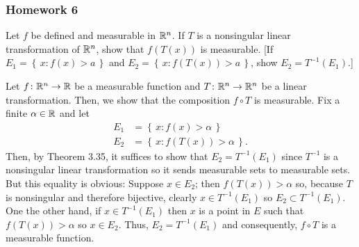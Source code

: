 \subsubsection{Homework 6}
\setcounter{exercise}{0}
\begin{problem}
  Let $f$ be defined and measurable in $\mathbb{R}^n$. If $T$ is a nonsingular
  linear transformation of $\mathbb{R}^n$, show that $f(T(x))$ is measurable. [If
  $E_1=\left\{\,x: f(x)>a\,\right\}$ and
  $E_2=\left\{\,x:f(T(x))>a\,\right\}$, show $E_2=T^{-1}(E_1)$.]
\end{problem}
\begin{solution}
  Let $f\colon\mathbb{R}^n\to\mathbb{R}$ be a measurable function and
  $T\colon\mathbb{R}^n\to\mathbb{R}^n$ be a linear transformation. Then, we show that
  the composition $f\circ T$ is measurable. Fix a finite $\alpha\in\mathbb{R}$
  and let
  \begin{align*}
    E_1&=\left\{\,x:f(x)>\alpha\,\right\}\\
    E_2&=\left\{\,x:f(T(x))>\alpha\,\right\}.
  \end{align*}
  Then, by Theorem 3.35, it suffices to show that $E_2=T^{-1}(E_1)$ since
  $T^{-1}$ is a nonsingular linear transformation so it sends measurable
  sets to measurable sets. But this equality is obvious: Suppose
  $x\in E_2$; then $f(T(x))>\alpha$ so, because $T$ is nonsingular and
  therefore bijective, clearly $x\in T^{-1}(E_1)$ so $E_2\subset
  T^{-1}(E_1)$. One the other hand, if $x\in T^{-1}(E_1)$ then $x$ is a
  point in $E$ such that $f(T(x))>\alpha$ so $x\in E_2$. Thus,
  $E_2=T^{-1}(E_1)$ and consequently, $f\circ T$ is a measurable function.
\end{solution}

